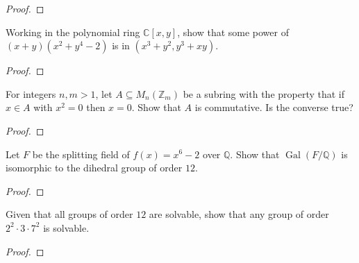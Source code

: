 \documentclass{article}
\newenvironment{problem}[2][Problem]{\begin{trivlist}
\item[\hskip \labelsep {\bfseries #1}\hskip \labelsep {\bfseries #2.}]}{\end{trivlist}}
\newcommand{\Q}{\mathbb Q}
\newcommand{\C}{\mathbb C}
\newcommand{\Gal}{\operatorname{Gal}}
\begin{document}
\begin{proof}
\end{proof}
\pagebreak

\begin{problem}{3}
  Working in the polynomial ring $\C[x, y]$, show that some power of $(x + y)(x^2 + y^4 -2)$ is in $(x^3 + y^2, y^3 + xy)$.
\end{problem}

\begin{proof}
\end{proof}
\pagebreak

\begin{problem}{4}
  For integers $n ,m > 1$, let $A \subseteq M_n(\mathbb Z_m)$ be a subring with the property that if $x \in A$ with $x^2 = 0$ then $x = 0$. Show that $A$ is commutative. Is the converse true?
\end{problem}

\begin{proof}
\end{proof}
\pagebreak

\begin{problem}{5}
  Let $F$ be the splitting field of $f(x) = x^6 - 2$ over $\Q$. Show that $\Gal(F/\Q)$ is isomorphic to the dihedral group of order $12$.
\end{problem}

\begin{proof}
\end{proof}
\pagebreak

\begin{problem}{6}
  Given that all groups of order $12$ are solvable, show that any group of order $2^2 \cdot 3 \cdot 7^2$ is solvable.
\end{problem}

\begin{proof}
\end{proof}
\end{document}
